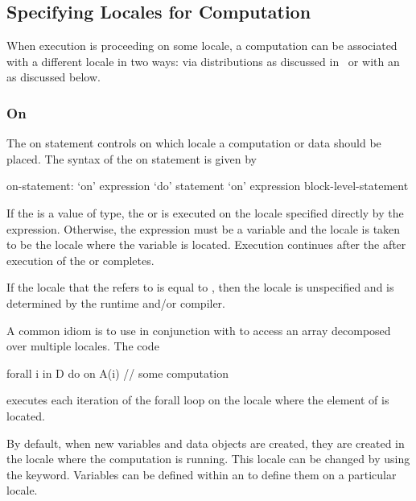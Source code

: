 \subsection{Specifying Locales for Computation}
\label{Specifying_Locales_for_Computation}

When execution is proceeding on some locale, a computation can be
associated with a different locale in two ways: via distributions as
discussed in~ or with an  as
discussed below.

\subsubsection{On}
\label{On}

The on statement controls on which locale a computation or data should
be placed.  The syntax of the on statement is given by
\begin{syntax}
on-statement:
  `on' expression `do' statement
  `on' expression block-level-statement
\end{syntax}
If the  is a value of  type,
the  or  is executed on
the locale specified directly by the expression.  Otherwise, the
expression must be a variable and the locale is taken to be the locale
where the variable is located.  Execution continues after
the  after execution of the 
or  completes.

If the locale that the  refers to is equal
to , then the locale is unspecified and is determined by
the runtime and/or compiler.

\begin{example}
A common idiom is to use  in conjunction with 
to access an array decomposed over multiple locales.  The code
\begin{chapel}
forall i in D do on A(i) {
  // some computation
}
\end{chapel}
executes each iteration of the forall loop on the locale where the
element of  is located.
\end{example}

By default, when new variables and data objects are created, they are
created in the locale where the computation is running.  This locale
can be changed by using the  keyword.  Variables can be
defined within an  to define them on a particular
locale.

